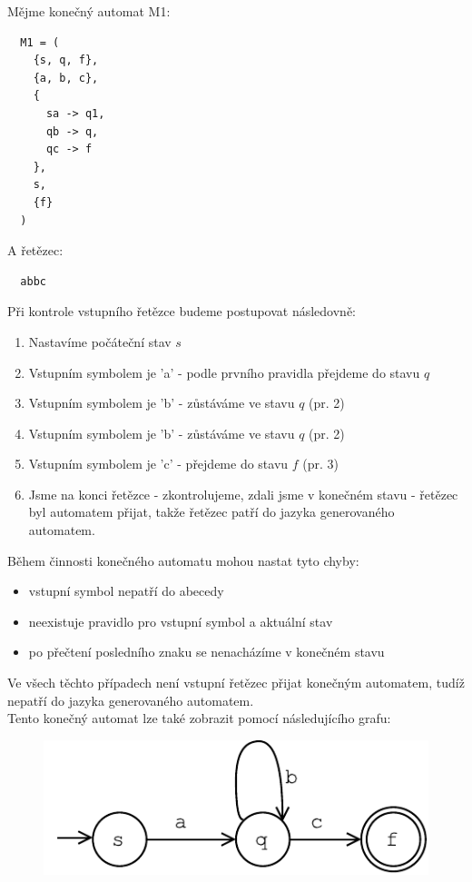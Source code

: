\begin{exmp}
  Mějme konečný automat M1:
  \begin{lstlisting}
  M1 = (
    {s, q, f},
    {a, b, c},
    {
      sa -> q1,
      qb -> q,
      qc -> f
    },
    s,
    {f}
  )
  \end{lstlisting}
  A řetězec:
\begin{lstlisting}
  abbc
\end{lstlisting}

\noindent
Při kontrole vstupního řetězce budeme postupovat následovně:

\begin{enumerate}
  \item Nastavíme počáteční stav $s$
  \item Vstupním symbolem je 'a' - podle prvního pravidla přejdeme do stavu $q$
  \item Vstupním symbolem je 'b' - zůstáváme ve stavu $q$ (pr. 2)
  \item Vstupním symbolem je 'b' - zůstáváme ve stavu $q$ (pr. 2)
  \item Vstupním symbolem je 'c' - přejdeme do stavu $f$ (pr. 3)
  \item Jsme na konci řetězce - zkontrolujeme, zdali jsme v konečném stavu - řetězec byl automatem přijat,
  takže řetězec patří do jazyka generovaného automatem.
\end{enumerate}

\noindent
Během činnosti konečného automatu mohou nastat tyto chyby:

\begin{itemize}
  \item vstupní symbol nepatří do abecedy
  \item neexistuje pravidlo pro vstupní symbol a aktuální stav
  \item po přečtení posledního znaku se nenacházíme v konečném stavu
\end{itemize}
Ve všech těchto případech není vstupní řetězec přijat konečným automatem, tudíž nepatří
do jazyka generovaného automatem.\\

\noindent
Tento konečný automat lze také zobrazit pomocí následujícího grafu:

\begin{figure}[H]
  \centering
  \includegraphics{fig/finiteAutomat.pdf}
\end{figure}

\end{exmp}

